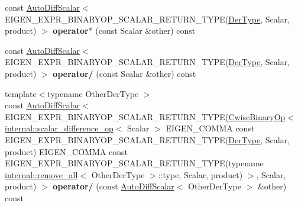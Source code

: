 \begin{DoxyCompactItemize}
\item 
\mbox{\label{class_eigen_1_1_auto_diff_scalar_a5d1578ced55b4d8d9a62824769ae40d0}} 
const \hyperlink{class_eigen_1_1_auto_diff_scalar}{Auto\+Diff\+Scalar}$<$ E\+I\+G\+E\+N\+\_\+\+E\+X\+P\+R\+\_\+\+B\+I\+N\+A\+R\+Y\+O\+P\+\_\+\+S\+C\+A\+L\+A\+R\+\_\+\+R\+E\+T\+U\+R\+N\+\_\+\+T\+Y\+PE(\hyperlink{group___sparse_core___module}{Der\+Type}, Scalar, product) $>$ {\bfseries operator$\ast$} (const Scalar \&other) const
\item 
\mbox{\label{class_eigen_1_1_auto_diff_scalar_a127f823ca6cdd366a830259393a62c02}} 
const \hyperlink{class_eigen_1_1_auto_diff_scalar}{Auto\+Diff\+Scalar}$<$ E\+I\+G\+E\+N\+\_\+\+E\+X\+P\+R\+\_\+\+B\+I\+N\+A\+R\+Y\+O\+P\+\_\+\+S\+C\+A\+L\+A\+R\+\_\+\+R\+E\+T\+U\+R\+N\+\_\+\+T\+Y\+PE(\hyperlink{group___sparse_core___module}{Der\+Type}, Scalar, product) $>$ {\bfseries operator/} (const Scalar \&other) const
\item 
\mbox{\label{class_eigen_1_1_auto_diff_scalar_ada083e615e9a99170467c29224f96917}} 
{\footnotesize template$<$typename Other\+Der\+Type $>$ }\\const \hyperlink{class_eigen_1_1_auto_diff_scalar}{Auto\+Diff\+Scalar}$<$ E\+I\+G\+E\+N\+\_\+\+E\+X\+P\+R\+\_\+\+B\+I\+N\+A\+R\+Y\+O\+P\+\_\+\+S\+C\+A\+L\+A\+R\+\_\+\+R\+E\+T\+U\+R\+N\+\_\+\+T\+Y\+PE(\hyperlink{group___core___module_class_eigen_1_1_cwise_binary_op}{Cwise\+Binary\+Op}$<$ \hyperlink{struct_eigen_1_1internal_1_1scalar__difference__op}{internal\+::scalar\+\_\+difference\+\_\+op}$<$ Scalar $>$ E\+I\+G\+E\+N\+\_\+\+C\+O\+M\+MA const E\+I\+G\+E\+N\+\_\+\+E\+X\+P\+R\+\_\+\+B\+I\+N\+A\+R\+Y\+O\+P\+\_\+\+S\+C\+A\+L\+A\+R\+\_\+\+R\+E\+T\+U\+R\+N\+\_\+\+T\+Y\+PE(\hyperlink{group___sparse_core___module}{Der\+Type}, Scalar, product) E\+I\+G\+E\+N\+\_\+\+C\+O\+M\+MA const E\+I\+G\+E\+N\+\_\+\+E\+X\+P\+R\+\_\+\+B\+I\+N\+A\+R\+Y\+O\+P\+\_\+\+S\+C\+A\+L\+A\+R\+\_\+\+R\+E\+T\+U\+R\+N\+\_\+\+T\+Y\+PE(typename \hyperlink{struct_eigen_1_1internal_1_1remove__all}{internal\+::remove\+\_\+all}$<$ Other\+Der\+Type $>$\+::type, Scalar, product) $>$, Scalar, product) $>$ {\bfseries operator/} (const \hyperlink{class_eigen_1_1_auto_diff_scalar}{Auto\+Diff\+Scalar}$<$ Other\+Der\+Type $>$ \&other) const
\item 
\mbox{\label{class_eigen_1_1_auto_diff_scalar_a667db5476e895fe41d3c603134fdab12}} 

\end{DoxyCompactItemize}
